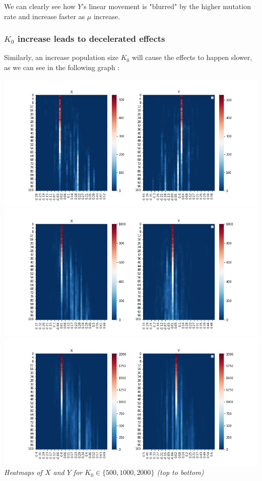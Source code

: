 \documentclass{article}
\begin{document}
We can clearly see how $Y$'s linear movement is "blurred" by the higher mutation rate and increase faster as $\mu$ increase. \\
\vspace{5mm}

\subsubsection{$K_0$ increase leads to decelerated effects}

Similarly, an increase population size $K_0$ will cause the effects to happen slower, as we can see in the following graph : \\
\vspace{5mm}

\begin{center}
\includegraphics[scale=0.37]{500k0}
\includegraphics[scale=0.37]{1000k0}
\includegraphics[scale=0.37]{2000k0} \\
\textit{Heatmaps of $X$ and $Y$ for $K_0 \in \lbrace 500, 1000, 2000 \rbrace$ (top to bottom)}
\end{center}
\end{document}
